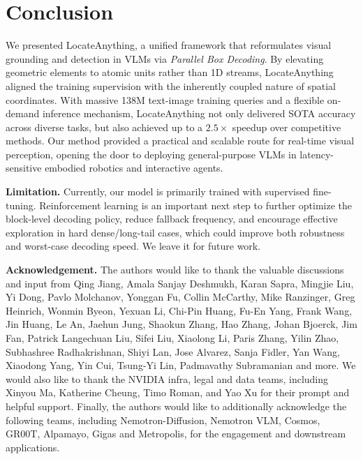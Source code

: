 \section{Conclusion}\label{sec:conclusion}
We presented LocateAnything, a unified framework that reformulates visual grounding and detection in VLMs via \emph{Parallel Box Decoding}. By elevating geometric elements to atomic units rather than 1D streams, LocateAnything aligned the training supervision with the inherently coupled nature of spatial coordinates. With massive 138M text-image training queries and a flexible on-demand inference mechanism, LocateAnything not only delivered SOTA accuracy across diverse tasks, but also achieved up to a $2.5\times$ speedup over competitive methods. Our method provided a practical and scalable route for real-time visual perception, opening the door to deploying general-purpose VLMs in latency-sensitive embodied robotics and interactive agents.

\noindent\textbf{Limitation.} Currently, our model is primarily trained with supervised fine-tuning. Reinforcement learning is an important next step to further optimize the block-level decoding policy, reduce fallback frequency, and encourage effective exploration in hard dense/long-tail cases, which could improve both robustness and worst-case decoding speed. We leave it for future work.

\noindent\textbf{Acknowledgement.} The authors would like to thank the valuable discussions and input from Qing Jiang, Amala Sanjay Deshmukh, Karan Sapra, Mingjie Liu, Yi Dong, Pavlo Molchanov, Yonggan Fu, Collin McCarthy, Mike Ranzinger, Greg Heinrich, Wonmin Byeon, Yexuan Li, Chi-Pin Huang, Fu-En Yang, Frank Wang, Jin Huang, Le An, Jaehun Jung, Shaokun Zhang, Hao Zhang, Johan Bjoerck, Jim Fan, Patrick Langechuan Liu, Sifei Liu, Xiaolong Li, Paris Zhang, Yilin Zhao, Subhashree Radhakrishnan, Shiyi Lan, Jose Alvarez, Sanja Fidler, Yan Wang, Xiaodong Yang, Yin Cui, Tsung-Yi Lin, Padmavathy Subramanian and more. We would also like to thank the NVIDIA infra, legal and data teams, including Xinyou Ma, Katherine Cheung, Timo Roman, and Yao Xu for their prompt and helpful support. Finally, the authors would like to additionally acknowledge the following teams, including Nemotron-Diffusion, Nemotron VLM, Cosmos, GR00T, Alpamayo, Gigas and Metropolis, for the engagement and downstream applications.
